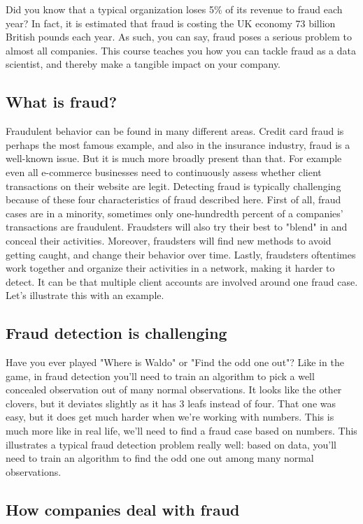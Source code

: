 Did you know that a typical organization loses 5\% of its revenue to fraud each year? In fact, it is estimated that fraud is costing the UK economy 73 billion British pounds each year. As such, you can say, fraud poses a serious problem to almost all companies. This course teaches you how you can tackle fraud as a data scientist, and thereby make a tangible impact on your company.

\subsection{What is fraud?}

Fraudulent behavior can be found in many different areas. Credit card fraud is perhaps the most famous example, and also in the insurance industry, fraud is a well-known issue. But it is much more broadly present than that. For example even all e-commerce businesses need to continuously assess whether client transactions on their website are legit. Detecting fraud is typically challenging because of these four characteristics of fraud described here. First of all, fraud cases are in a minority, sometimes only one-hundredth percent of a companies' transactions are fraudulent. Fraudsters will also try their best to "blend" in and conceal their activities. Moreover, fraudsters will find new methods to avoid getting caught, and change their behavior over time. Lastly, fraudsters oftentimes work together and organize their activities in a network, making it harder to detect. It can be that multiple client accounts are involved around one fraud case. Let's illustrate this with an example.

\subsection{Fraud detection is challenging}
Have you ever played "Where is Waldo" or "Find the odd one out"? Like in the game, in fraud detection you'll need to train an algorithm to pick a well concealed observation out of many normal observations. It looks like the other clovers, but it deviates slightly as it has 3 leafs instead of four. That one was easy, but it does get much harder when we're working with numbers. This is much more like in real life, we'll need to find a fraud case based on numbers. This illustrates a typical fraud detection problem really well: based on data, you'll need to train an algorithm to find the odd one out among many normal observations.

\subsection{How companies deal with fraud}

